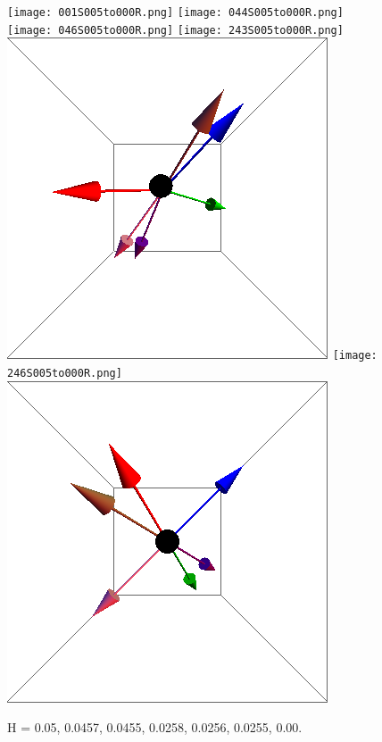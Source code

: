 \documentclass{article}
\begin{document}
\begin{figure}[ht]
\centering
\texttt{[image: 001S005to000R.png]}
\texttt{[image: 044S005to000R.png]}
\texttt{[image: 046S005to000R.png]}
\texttt{[image: 243S005to000R.png]}
\includegraphics[scale=0.23]{245S005to000R.png}
\texttt{[image: 246S005to000R.png]}
\includegraphics[scale=0.23]{501S005to000R.png}
\caption{H = 0.05, 0.0457, 0.0455, 0.0258, 0.0256, 0.0255, 0.00.}
\end{figure}
\end{document}
